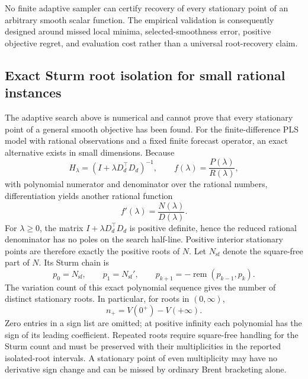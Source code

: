 \documentclass[english]{smcca}
\begin{document}
No finite adaptive sampler can certify recovery of every stationary point of an arbitrary smooth scalar function. The empirical validation is consequently designed around missed local minima, selected-smoothness error, positive objective regret, and evaluation cost rather than a universal root-recovery claim.

\subsection{Exact Sturm root isolation for small rational instances}
\label{sec:sturm}

The adaptive search above is numerical and cannot prove that every
stationary point of a general smooth objective has been found. For
the finite-difference PLS model with rational observations and a
fixed finite forecast operator, an exact alternative exists in
small dimensions. Because
\begin{equation}
\label{eq:sturm_rational}
H_{\lambda}=(I+\lambda D_d^\top D_d)^{-1},
\qquad
f(\lambda)=\frac{P(\lambda)}{R(\lambda)},
\end{equation}
with polynomial numerator and denominator over the rational
numbers, differentiation yields another rational function
\begin{equation}
\label{eq:sturm_derivative}
f'(\lambda)=\frac{N(\lambda)}{D(\lambda)}.
\end{equation}
For $\lambda\ge0$, the matrix $I+\lambda D_d^\top D_d$
is positive definite, hence the reduced rational
denominator has no poles on the search half-line. Positive
interior stationary points are therefore exactly the positive
roots of $N$. Let $N_{\mathrm{sf}}$ denote the square-free part of $N$.
Its Sturm chain \cite{basu2006algorithms} is
\begin{equation}
\label{eq:sturm_chain}
p_0=N_{\mathrm{sf}},\qquad p_1=N_{\mathrm{sf}}',\qquad
p_{k+1}=-\operatorname{rem}(p_{k-1},p_k).
\end{equation}
The variation count of this exact polynomial sequence gives
the number of distinct stationary roots. In particular, for roots in $(0,\infty)$,
\begin{equation}
\label{eq:sturm_count}
n_{+}=V(0^+)-V(+\infty).
\end{equation}
Zero entries in a sign list are omitted; at positive infinity
each polynomial has the sign of its leading coefficient.
Repeated roots require square-free handling for the Sturm
count and must be preserved with their multiplicities in the
reported isolated-root intervals. A stationary point of even
multiplicity may have no derivative sign change and can be
missed by ordinary Brent bracketing alone.
\end{document}
